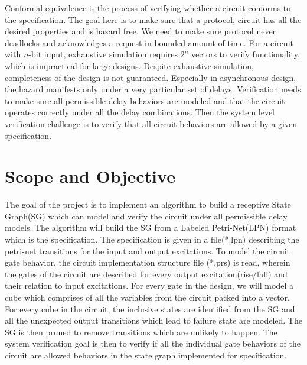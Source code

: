 \documentclass[10pt,journal,compsoc]{IEEEtran}
\begin{document}

Conformal equivalence is the process of verifying whether a circuit conforms to the specification. The goal here is to make sure that a protocol, circuit has all the desired properties and is hazard free. We need to make sure protocol never deadlocks and acknowledges a request in bounded amount of time. For a circuit with $n$-bit input, exhaustive simulation requires $2^n$ vectors to verify functionality, which is impractical for large designs. Despite exhaustive simulation, completeness of the design is not guaranteed. Especially in asynchronous design, the hazard manifests only under a very particular set of delays. Verification needs to make sure all permissible delay behaviors are modeled and that the circuit operates correctly under all the delay combinations.
Then the system level verification challenge is to verify that all circuit behaviors are allowed by a given specification.

\section{Scope and Objective}

The goal of the project is to implement an algorithm to build a receptive State Graph(SG) which can model and verify the circuit under all permissible delay models. The algorithm will build the SG from a Labeled Petri-Net(LPN) format which is the specification. The specification is given in a file(*.lpn) describing the petri-net transitions for the input and output excitations. To model the circuit gate behavior, the circuit implementation structure file (*.prs) is read, wherein the gates of the circuit are described for every output excitation(rise/fall) and their relation to input excitations. For every gate in the design, we will model a cube which comprises of all the variables from the circuit packed into a vector. For every cube in the circuit, the inclusive states are identified from the SG and all the unexpected output transitions which lead to failure state are modeled. The SG is then pruned to remove transitions which are unlikely to happen. The system verification goal is then to verify if all the individual gate behaviors of the circuit are allowed behaviors in the state graph implemented for specification. 
\end{document}
